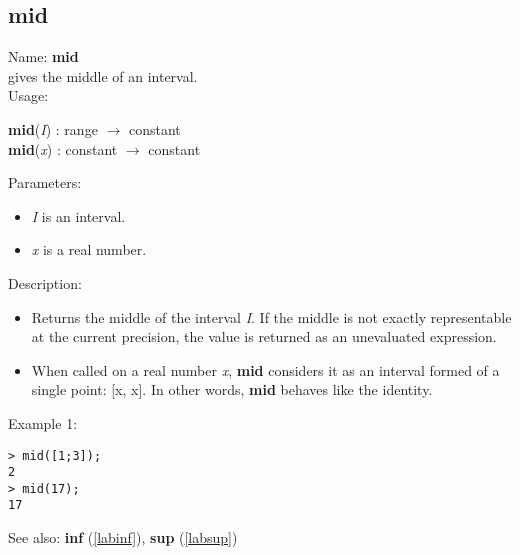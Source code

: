 \subsection{mid}
\label{labmid}
\noindent Name: \textbf{mid}\\
gives the middle of an interval.\\

\noindent Usage: 
\begin{center}
\textbf{mid}(\emph{I}) : \textsf{range} $\rightarrow$ \textsf{constant}\\
\textbf{mid}(\emph{x}) : \textsf{constant} $\rightarrow$ \textsf{constant}\\
\end{center}
Parameters: 
\begin{itemize}
\item \emph{I} is an interval.
\item \emph{x} is a real number.
\end{itemize}
\noindent Description: \begin{itemize}

\item Returns the middle of the interval \emph{I}. If the middle is not exactly
   representable at the current precision, the value is returned as an
   unevaluated expression.

\item When called on a real number \emph{x}, \textbf{mid} considers it as an interval formed
   of a single point: [x, x]. In other words, \textbf{mid} behaves like the identity.
\end{itemize}
\noindent Example 1: 
\begin{center}\begin{minipage}{15cm}\begin{Verbatim}[frame=single]
> mid([1;3]);
2
> mid(17);
17
\end{Verbatim}
\end{minipage}\end{center}
See also: \textbf{inf} (\ref{labinf}), \textbf{sup} (\ref{labsup})
